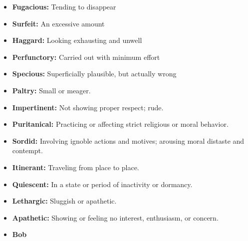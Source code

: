 \documentclass[crop=false,class=book]{standalone}
\begin{document}
\begin{itemize}[noitemsep]
                \item \textbf{Fugacious:} Tending to disappear
                \item \textbf{Surfeit:} An excessive amount
                \item \textbf{Haggard:} Looking exhausting and unwell
                \item \textbf{Perfunctory:} Carried out with minimum effort
                \item \textbf{Specious:} Superficially plausible, but actually wrong
                \item \textbf{Paltry:} Small or meager.
                \item \textbf{Impertinent:} Not showing proper respect; rude.
                \item \textbf{Puritanical:} Practicing or affecting strict
                      religious or moral behavior.
                \item \textbf{Sordid:} Involving ignoble actions and motives;
                      arousing moral distaste and contempt.
                \item \textbf{Itinerant:} Traveling from place to place.
                \item \textbf{Quiescent:} In a state or period of inactivity or dormancy.
                \item \textbf{Lethargic:} Sluggish or apathetic.
                \item \textbf{Apathetic:} Showing or feeling no interest, enthusiasm, or concern.
                \item \textbf{Bob}
            \end{itemize}
\end{document}
